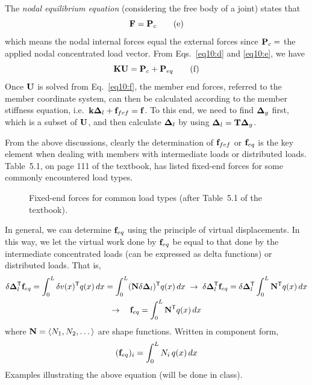 The \emph{nodal equilibrium equation} (considering the free body of a joint) states that
\begin{equation}
  \mathbf{F} = \mathbf{P}_c \tag{e}\label{eq10:e}
\end{equation}
which means the nodal internal forces equal the external forces since $\mathbf{P}_c =$ the applied nodal concentrated load vector. From Eqs.~\eqref{eq10:d} and \eqref{eq10:e}, we have
\begin{equation}
  \mathbf{K}\mathbf{U} = \mathbf{P}_c + \mathbf{P}_{eq} \tag{f}\label{eq10:f}
\end{equation}
Once $\mathbf{U}$ is solved from Eq.~\eqref{eq10:f}, the member end forces, referred to the member coordinate system, can then be calculated according to the member stiffness equation, i.e.\ $\mathbf{k}\bm{\Delta}_l + \mathbf{f}_{fef} = \mathbf{f}$. To this end, we need to find $\bm{\Delta}_g$ first, which is a subset of $\mathbf{U}$, and then calculate $\bm{\Delta}_l$ by using $\bm{\Delta}_l = \mathbf{T}\bm{\Delta}_g$.

From the above discussions, clearly the determination of $\mathbf{f}_{fef}$ or $\mathbf{f}_{eq}$ is the key element when dealing with members with intermediate loads or distributed loads. Table~5.1, on page 111 of the textbook, has listed fixed-end forces for some commonly encountered load types.
\begin{figure}[H]
  \centering
  
  \caption{Fixed-end forces for common load types (after Table~5.1 of the textbook).}
  \label{fig:fef-table}
\end{figure}

In general, we can determine $\mathbf{f}_{eq}$ using the principle of virtual displacements. In this way, we let the virtual work done by $\mathbf{f}_{eq}$ be equal to that done by the intermediate concentrated loads (can be expressed as delta functions) or distributed loads. That is,
\begin{gather}
  \delta\bm{\Delta}_l^{\mathsf{T}}\mathbf{f}_{eq} = \int_0^L \delta v(x)^{\mathsf{T}} q(x)\,dx = \int_0^L (\mathbf{N}\delta\bm{\Delta}_l)^{\mathsf{T}} q(x)\,dx
  \;\rightarrow\; \delta\bm{\Delta}_l^{\mathsf{T}}\mathbf{f}_{eq} = \delta\bm{\Delta}_l^{\mathsf{T}}\int_0^L \mathbf{N}^{\mathsf{T}} q(x)\,dx\\
  \rightarrow\quad \mathbf{f}_{eq} = \int_0^L \mathbf{N}^{\mathsf{T}} q(x)\,dx
\end{gather}
where $\mathbf{N} = \langle N_1, N_2, \dots\rangle$ are shape functions. Written in component form,
\begin{equation}
  (\mathbf{f}_{eq})_i = \int_0^L N_i\,q(x)\,dx
\end{equation}
Examples illustrating the above equation (will be done in class).

